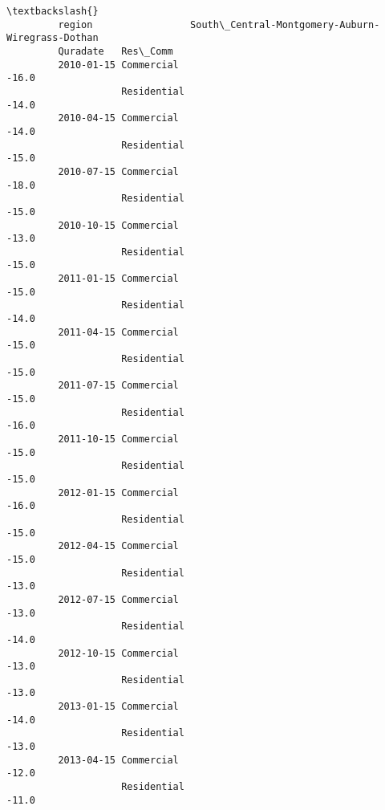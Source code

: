 \documentclass[11pt]{article}
\begin{document}
\begin{Verbatim}[commandchars=\\\{\}]
                                                                                  \textbackslash{}
         region                 South\_Central-Montgomery-Auburn-Wiregrass-Dothan   
         Quradate   Res\_Comm                                                       
         2010-01-15 Commercial                                             -16.0   
                    Residential                                            -14.0   
         2010-04-15 Commercial                                             -14.0   
                    Residential                                            -15.0   
         2010-07-15 Commercial                                             -18.0   
                    Residential                                            -15.0   
         2010-10-15 Commercial                                             -13.0   
                    Residential                                            -15.0   
         2011-01-15 Commercial                                             -15.0   
                    Residential                                            -14.0   
         2011-04-15 Commercial                                             -15.0   
                    Residential                                            -15.0   
         2011-07-15 Commercial                                             -15.0   
                    Residential                                            -16.0   
         2011-10-15 Commercial                                             -15.0   
                    Residential                                            -15.0   
         2012-01-15 Commercial                                             -16.0   
                    Residential                                            -15.0   
         2012-04-15 Commercial                                             -15.0   
                    Residential                                            -13.0   
         2012-07-15 Commercial                                             -13.0   
                    Residential                                            -14.0   
         2012-10-15 Commercial                                             -13.0   
                    Residential                                            -13.0   
         2013-01-15 Commercial                                             -14.0   
                    Residential                                            -13.0   
         2013-04-15 Commercial                                             -12.0   
                    Residential                                            -11.0   

\end{Verbatim}
\end{document}
